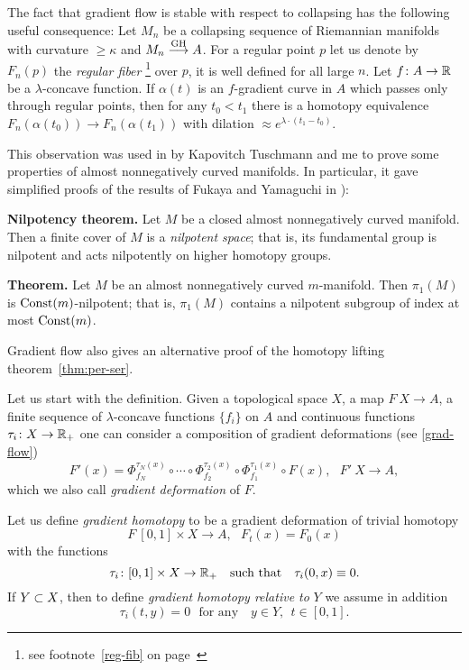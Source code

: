 \documentclass{article}
\begin{document}
The fact that gradient flow is stable with respect to collapsing has the
following useful consequence: Let $M_n$ be a collapsing sequence of Riemannian
manifolds with curvature $\ge\kappa$ and $M_n\GHto A$.
For a regular point $p$ let us denote by $F_n(p)$ the \emph{regular fiber}%
\footnote{see footnote~\ref{reg-fib} on page~\pageref{reg-fib}} 
over $p$, 
it is well defined for all large $n$.
Let $f\colon A\to\mathbb{R}$ be a $\lambda$-concave function.
If $\alpha(t)$ is an $f$-gradient curve in $A$  which passes only through
regular points, then for any $t_0<t_1$
there is a homotopy equivalence $F_n(\alpha(t_0))\to F_n(\alpha(t_1))$ with
dilation $\approx e^{\lambda{\cdot}(t_1-t_0)}$.

This observation was used in \cite{KPT} by Kapovitch Tuschmann and me
to prove some properties of almost
nonnegatively curved manifolds. 
In particular, it gave simplified proofs of
the results of Fukaya and Yamaguchi in \cite{FY}):

\begin{thm}{\bf Nilpotency theorem.} Let $M$ be a closed almost nonnegatively curved manifold.
Then a finite cover of $M$ is a \emph{nilpotent space};
that is, 
its fundamental group is nilpotent and acts nilpotently on higher homotopy groups.
\end{thm}

\begin{thm}{\bf Theorem.} Let $M$ be an almost nonnegatively curved
$m$-manifold. Then $\pi_1(M)$ is $\operatorname{Const}(m)$-nilpotent;
that is, 
$\pi_1(M)$ contains a nilpotent subgroup of
index at most $\operatorname{Const}(m)$.
\end{thm}

Gradient flow also gives an alternative proof of the homotopy lifting theorem~\ref{thm:per-ser}. 

Let us start with the definition.
Given a topological space $X$, a map $F\:X\to A$, a finite sequence of $\lambda$-concave functions $\{f_i\}$ on $A$ and continuous functions $\tau_i\colon X\to\mathbb{R}_+$ one can consider a composition of gradient deformations (see \ref{grad-flow})
$$F'(x)=\Phi_{f_N}^{\tau_N(x)}\circ\cdots\circ\Phi_{f_2}^{\tau_2(x)}\circ\Phi_{f_1}^{\tau_1(x)}\circ F(x),\ \ \ F'\:X\to A,$$
which we also call \textit{gradient deformation} of $F$.

Let us define {\it gradient homotopy} to be a gradient deformation of trivial homotopy 
$$F\:[0,1]\times X\to A,\ \ \ F_t(x)=F_0(x)$$
with the functions 
$$\tau_i\colon[0,1]\times X\to\mathbb{R}_+\ \ \ \text{such that}\ \ \ \tau_i(0,x)\equiv 0.$$
If $Y\subset X$, then to define \emph{gradient homotopy relative to} $Y$ we assume in addition $$\tau_i(t,y)= 0 \ \ \ \text{for any }\ \ \ y\in Y,\ \ t\in[0,1].$$
\end{document}
